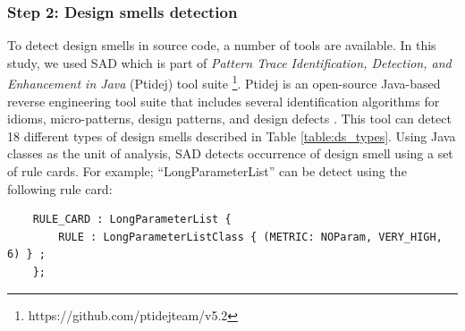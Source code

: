 \documentclass[AMA,Times1COL]{WileyNJDv5} %
\begin{document}
\subsubsection*{Step 2: Design smells detection}
To detect design smells in source code, a number of tools are available. In this study, we used SAD which is part of  \textit{Pattern Trace Identification, Detection, and Enhancement in Java} (Ptidej) tool suite \footnote{https://github.com/ptidejteam/v5.2}. Ptidej is an open-source Java-based reverse engineering tool suite that includes several identification algorithms for idioms, micro-patterns, design patterns, and design defects \cite{gueheneuc2007ptidej}. This tool can detect 18 different types of design smells described in Table \ref{table:ds_types}. Using Java classes as the unit of analysis, SAD detects occurrence of design smell using a set of rule cards. For example; ``LongParameterList'' can be detect using the following rule card:
\begin{verbatim}
	RULE_CARD : LongParameterList { 
		RULE : LongParameterListClass { (METRIC: NOParam, VERY_HIGH, 6) } ; 
	};
\end{verbatim}
\end{document}
